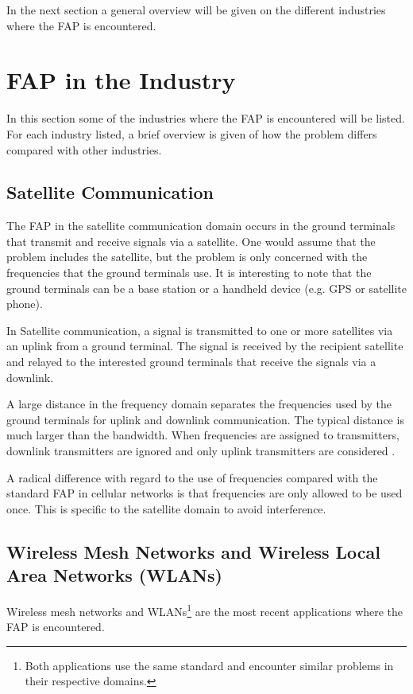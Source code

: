 In the next section a general overview will be given on the different industries where the FAP is encountered.
\section{FAP in the Industry}
\label{sec:FAPIndustry}
In this section some of the industries where the FAP is encountered will be listed. For each industry listed, a brief overview is given of how the problem differs compared with other industries. 

\subsection{Satellite Communication}
The FAP in the satellite communication domain occurs in the ground terminals that transmit and receive signals via a satellite. One would assume that the problem includes the satellite, but the problem is only concerned with the frequencies that the ground terminals use. It is interesting to note that the ground terminals can be a base station or a handheld device (e.g. GPS or satellite phone).

In Satellite communication, a signal is transmitted to one or more satellites via an uplink from a ground terminal. The signal is received by the recipient satellite and relayed to the interested ground terminals that receive the signals via a downlink.

 A large distance in the frequency domain separates the frequencies used by the ground terminals for uplink and downlink communication. The typical distance is much larger than the bandwidth. When frequencies are assigned to transmitters, downlink transmitters are ignored and only uplink transmitters are considered \cite{Karen2004}. 

A radical difference with regard to the use of frequencies compared with the standard FAP in cellular networks is that frequencies are only allowed to be used once. This is specific to the satellite domain to avoid interference\cite{Karen2004}.

\subsection{Wireless Mesh Networks and Wireless Local Area Networks (WLANs)}
Wireless mesh networks and WLANs\footnote{Both applications use the same standard and encounter similar problems in their respective domains.} are the most recent applications where the FAP is encountered. 

